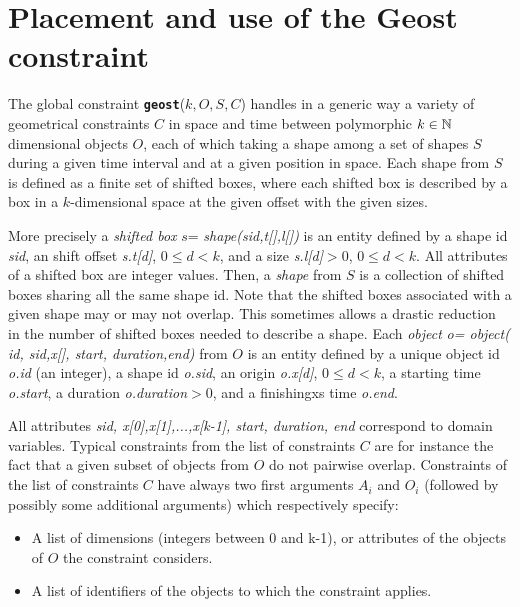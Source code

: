 \label{geostdescription}
\hypertarget{geostdescription}{}


\section{Placement and use of the Geost constraint}\label{geostdescription:placementanduseofthegeostconstraint}\hypertarget{geostdescription:placementanduseofthegeostconstraint}{}

The global constraint \texttt{\bf geost}($k,O,S,C$) handles in a generic way a variety of geometrical constraints $C$ in space and time between polymorphic $k\in\mathbb{N}$ dimensional objects $O$, each of which taking a shape among a set of shapes $S$ during a given time interval and at a given position in space. Each shape from $S$ is defined as a finite set of shifted boxes, where each shifted box is described by a box in a $k$-dimensional space at the given offset with the given sizes.

More precisely a \emph{shifted box} $s$= \emph{shape(sid,t[],l[])} is an entity defined by a shape id \emph{sid}, an shift offset \emph{s.t[d]}, $0\le d < k$, and a size \emph{s.l[d]}$>0$, $0\le d<k$. All attributes of a shifted box are integer values. Then, a \emph{shape} from $S$ is a collection of shifted boxes sharing all the same shape id. Note that the shifted boxes associated with a given shape may or may not overlap. This sometimes allows a drastic reduction in the number of shifted boxes needed to describe a shape.
Each \emph{object} \emph{o= object( id, sid,x[], start, duration,end)} from $O$ is an entity defined by a unique object id \emph{o.id} (an integer), a shape id \emph{o.sid}, an origin \emph{o.x[d]}, $0\le d<k$, a starting time \emph{o.start}, a duration \emph{o.duration}$>0$, and a finishingxs time \emph{o.end}.

All attributes \emph{sid, x[0],x[1],...,x[k-1], start, duration, end} correspond to domain variables. Typical constraints from the
list of constraints $C$ are for instance the fact that a given subset of objects from $O$ do not pairwise overlap.
Constraints of the list of constraints $C$ have always two first arguments $A_i$ and $O_i$ (followed by possibly some additional arguments) which respectively specify:
\begin{itemize}
	\item A list of dimensions (integers between 0 and k-1), or attributes of the objects of $O$ the constraint considers.
	\item A list of identifiers of the objects to which the constraint applies.
\end{itemize}

